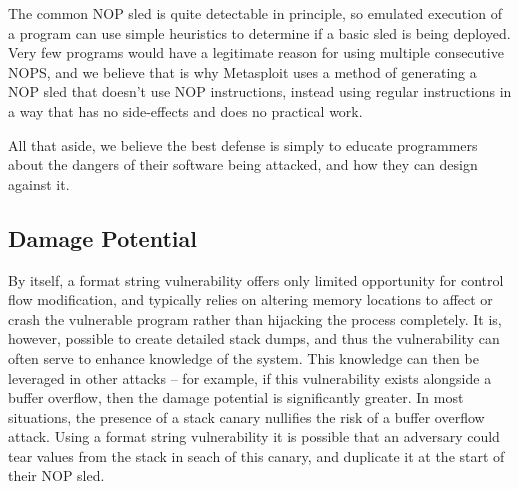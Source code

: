 The common NOP sled is quite detectable in principle, so emulated execution of a program can use simple heuristics to
determine if a basic sled is being deployed. Very few programs would have a legitimate reason for using multiple
consecutive NOPS\cite{zip_quine}, and we believe that is why Metasploit uses a method of generating a NOP sled that
doesn't use NOP instructions, instead using regular instructions in a way that has no side-effects and does no practical
work\cite{wiki_sled}.

All that aside, we believe the best defense is simply to educate programmers about the dangers of their software being
attacked, and how they can design against it.

\subsection{Damage Potential}

By itself, a format string vulnerability offers only limited opportunity for control flow modification, and typically
relies on altering memory locations to affect or crash the vulnerable program rather than hijacking the process completely.
It is, however, possible to create detailed stack dumps, and thus the vulnerability can often serve to
enhance knowledge of the system. This knowledge can then be leveraged in other attacks -- for example, if this
vulnerability exists alongside a buffer overflow, then the damage potential is significantly greater. In most
situations, the presence of a stack canary nullifies the risk of a buffer overflow attack. Using a format string
vulnerability it is possible that an adversary could tear values from the stack in seach of this canary, and duplicate
it at the start of their NOP sled.

